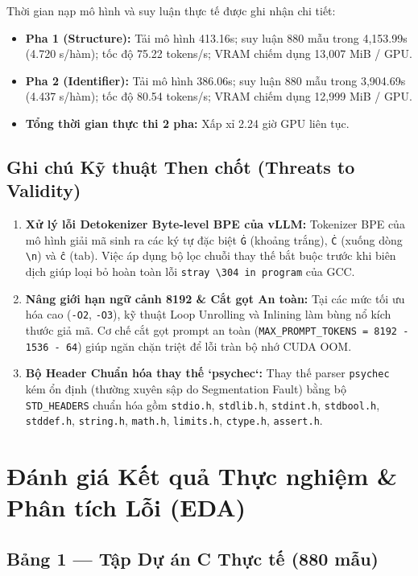 \documentclass[11pt,a4paper]{article}
\begin{document}
Thời gian nạp mô hình và suy luận thực tế được ghi nhận chi tiết:
\begin{itemize}
    \item \textbf{Pha 1 (Structure):} Tải mô hình 413.16s; suy luận 880 mẫu trong 4,153.99s (4.720 s/hàm); tốc độ 75.22 tokens/s; VRAM chiếm dụng 13,007 MiB / GPU.
    \item \textbf{Pha 2 (Identifier):} Tải mô hình 386.06s; suy luận 880 mẫu trong 3,904.69s (4.437 s/hàm); tốc độ 80.54 tokens/s; VRAM chiếm dụng 12,999 MiB / GPU.
    \item \textbf{Tổng thời gian thực thi 2 pha:} Xấp xỉ 2.24 giờ GPU liên tục.
\end{itemize}

\subsection{Ghi chú Kỹ thuật Then chốt (Threats to Validity)}
\begin{enumerate}
    \item \textbf{Xử lý lỗi Detokenizer Byte-level BPE của vLLM:} Tokenizer BPE của mô hình giải mã sinh ra các ký tự đặc biệt \texttt{Ġ} (khoảng trắng), \texttt{Ċ} (xuống dòng \texttt{\textbackslash n}) và \texttt{ĉ} (tab). Việc áp dụng bộ lọc chuỗi thay thế bắt buộc trước khi biên dịch giúp loại bỏ hoàn toàn lỗi \texttt{stray \textbackslash 304 in program} của GCC.
    \item \textbf{Nâng giới hạn ngữ cảnh 8192 \& Cắt gọt An toàn:} Tại các mức tối ưu hóa cao (\texttt{-O2}, \texttt{-O3}), kỹ thuật Loop Unrolling và Inlining làm bùng nổ kích thước giả mã. Cơ chế cắt gọt prompt an toàn (\texttt{MAX\_PROMPT\_TOKENS = 8192 - 1536 - 64}) giúp ngăn chặn triệt để lỗi tràn bộ nhớ CUDA OOM.
    \item \textbf{Bộ Header Chuẩn hóa thay thế `psychec`:} Thay thế parser \texttt{psychec} kém ổn định (thường xuyên sập do Segmentation Fault) bằng bộ \texttt{STD\_HEADERS} chuẩn hóa gồm \texttt{stdio.h}, \texttt{stdlib.h}, \texttt{stdint.h}, \texttt{stdbool.h}, \texttt{stddef.h}, \texttt{string.h}, \texttt{math.h}, \texttt{limits.h}, \texttt{ctype.h}, \texttt{assert.h}.
\end{enumerate}

\section{Đánh giá Kết quả Thực nghiệm \& Phân tích Lỗi (EDA)}

\subsection{Bảng 1 — Tập Dự án C Thực tế (880 mẫu)}
\end{document}
